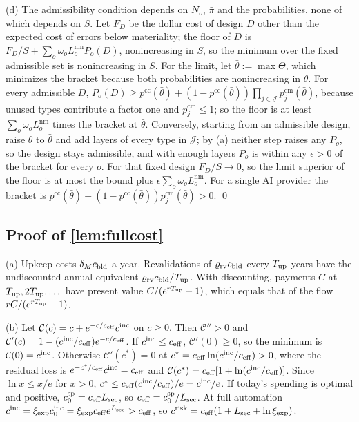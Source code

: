 (d) The admissibility condition depends on $N_o$, $\bar\pi$ and the probabilities, none of which depends on $S$. Let $F_D$ be the dollar cost of design $D$ other than the expected cost of errors below materiality; the floor of $D$ is $F_D/S+\sum_o\omega_oL^{\mathrm{nm}}_oP_o(D)$, nonincreasing in $S$, so the minimum over the fixed admissible set is nonincreasing in $S$. For the limit, let $\bar\theta:=\max\Theta$, which minimizes the bracket because both probabilities are nonincreasing in $\theta$. For every admissible $D$, $P_o(D)\ge p^{\mathrm{cc}}(\bar\theta)+(1-p^{\mathrm{cc}}(\bar\theta))\prod_{j\in\mathcal J}p^{\mathrm{cm}}_j(\bar\theta)$, because unused types contribute a factor one and $p^{\mathrm{cm}}_j\le1$; so the floor is at least $\sum_o\omega_oL^{\mathrm{nm}}_o$ times the bracket at $\bar\theta$. Conversely, starting from an admissible design, raise $\theta$ to $\bar\theta$ and add layers of every type in $\mathcal J$; by (a) neither step raises any $P_o$, so the design stays admissible, and with enough layers $P_o$ is within any $\epsilon>0$ of the bracket for every $o$. For that fixed design $F_D/S\to0$, so the limit superior of the floor is at most the bound plus $\epsilon\sum_o\omega_oL^{\mathrm{nm}}_o$. For a single AI provider the bracket is $p^{\mathrm{cc}}(\bar\theta)+(1-p^{\mathrm{cc}}(\bar\theta))p^{\mathrm{cm}}_j(\bar\theta)>0$. \qed

\subsection*{Proof of \autoref{lem:fullcost}}

(a) Upkeep costs $\delta_Mc_{\rm bld}$ a year. Revalidations of $\varrho_{\rm rv}c_{\rm bld}$ every $T_{\rm up}$ years have the undiscounted annual equivalent $\varrho_{\rm rv}c_{\rm bld}/T_{\rm up}$. With discounting, payments $C$ at $T_{\rm up},2T_{\rm up},\dots$ have present value $C/(e^{rT_{\rm up}}-1)$, which equals that of the flow $rC/(e^{rT_{\rm up}}-1)$.

(b) Let $\mathcal C(c)=c+e^{-c/c_{\rm eff}}c^{\rm inc}$ on $c\ge0$. Then $\mathcal C''>0$ and $\mathcal C'(c)=1-(c^{\rm inc}/c_{\rm eff})e^{-c/c_{\rm eff}}$. If $c^{\rm inc}\le c_{\rm eff}$, $\mathcal C'(0)\ge0$, so the minimum is $\mathcal C(0)=c^{\rm inc}$. Otherwise $\mathcal C'(c^*)=0$ at $c^*=c_{\rm eff}\ln(c^{\rm inc}/c_{\rm eff})>0$, where the residual loss is $e^{-c^*/c_{\rm eff}}c^{\rm inc}=c_{\rm eff}$ and $\mathcal C(c^*)=c_{\rm eff}[1+\ln(c^{\rm inc}/c_{\rm eff})]$. Since $\ln x\le x/e$ for $x>0$, $c^*\le c_{\rm eff}(c^{\rm inc}/c_{\rm eff})/e=c^{\rm inc}/e$. If today's spending is optimal and positive, $c^{\rm sp}_0=c_{\rm eff}L_{\rm sec}$, so $c_{\rm eff}=c^{\rm sp}_0/L_{\rm sec}$. At full automation $c^{\rm inc}=\xi_{\rm exp}c^{\rm inc}_0=\xi_{\rm exp}c_{\rm eff}e^{L_{\rm sec}}>c_{\rm eff}$, so $c^{\rm risk}=c_{\rm eff}(1+L_{\rm sec}+\ln\xi_{\rm exp})$.

